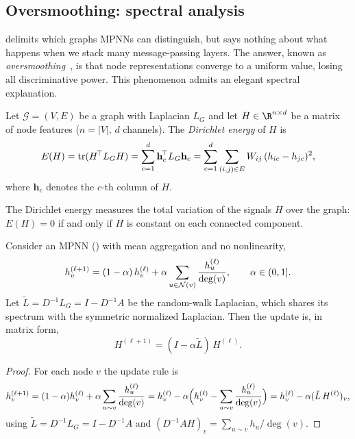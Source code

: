 \subsection{Oversmoothing: spectral analysis}
\label{sec:priors:oversmoothing}

 delimits which graphs MPNNs can distinguish, but says
nothing about what happens when we stack many message-passing layers. The
answer, known as \emph{oversmoothing}~\citep{li2018deeper}, is that node
representations converge to a uniform value, losing all discriminative power.
This phenomenon admits an elegant spectral explanation.

\begin{definition}
\label{def:priors:dirichlet-energy}
Let $\mathcal{G} = (V, E)$ be a graph with Laplacian $L_G$ and let
$H \in \R^{n \times d}$ be a matrix of node features ($n = |V|$, $d$ channels).
The \emph{Dirichlet energy} of $H$ is
\[
  E(H) = \tr(H^{\!\top} L_G H)
       = \sum_{c=1}^{d} \mathbf{h}_c^{\!\top} L_G \mathbf{h}_c
       = \sum_{c=1}^{d} \sum_{(i,j) \in E} W_{ij}\,(h_{ic} - h_{jc})^2,
\]
where $\mathbf{h}_c$ denotes the $c$-th column of $H$.
\end{definition}

The Dirichlet energy measures the total variation of the signals $H$ over the
graph: $E(H) = 0$ if and only if $H$ is constant on each connected component.

\begin{proposition}
\label{prop:priors:mpnn-diffusion}
Consider an MPNN () with mean aggregation and no
nonlinearity,
\[
  h_v^{(\ell+1)} = (1 - \alpha)\, h_v^{(\ell)}
      + \alpha \sum_{u \in \Nb(v)} \frac{h_u^{(\ell)}}{\deg(v)},
  \qquad \alpha \in (0, 1].
\]
Let $\tilde L = D^{-1} L_G = I - D^{-1} A$ be the random-walk Laplacian, which
shares its spectrum with the symmetric normalized Laplacian. Then the update is,
in matrix form,
\[
  H^{(\ell+1)} = (I - \alpha \tilde L)\, H^{(\ell)}.
\]
\end{proposition}

\begin{proof}
For each node $v$ the update rule is
\[
  h_v^{(\ell+1)}
    = (1 - \alpha) h_v^{(\ell)} + \alpha \sum_{u \sim v} \frac{h_u^{(\ell)}}{\deg(v)}
    = h_v^{(\ell)} - \alpha\Bigl(h_v^{(\ell)} - \sum_{u \sim v} \frac{h_u^{(\ell)}}{\deg(v)}\Bigr)
    = h_v^{(\ell)} - \alpha (\tilde L\, H^{(\ell)})_v,
\]
using $\tilde L = D^{-1} L_G = I - D^{-1} A$ and
$(D^{-1} A H)_v = \sum_{u \sim v} h_u / \deg(v)$. \qedhere
\end{proof}

